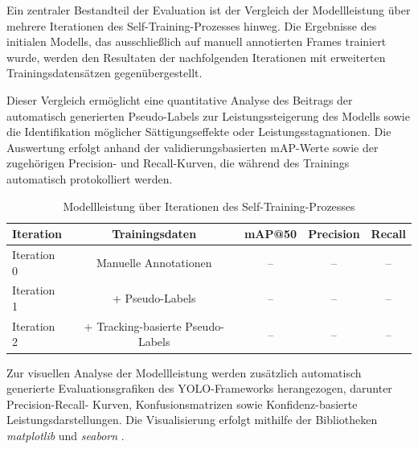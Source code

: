 Ein zentraler Bestandteil der Evaluation ist der Vergleich der Modellleistung über 
mehrere Iterationen des Self-Training-Prozesses hinweg. Die Ergebnisse des initialen 
Modells, das ausschließlich auf manuell annotierten Frames trainiert wurde, werden 
den Resultaten der nachfolgenden Iterationen mit erweiterten Trainingsdatensätzen 
gegenübergestellt.

Dieser Vergleich ermöglicht eine quantitative Analyse des Beitrags der automatisch 
generierten Pseudo-Labels zur Leistungssteigerung des Modells sowie die Identifikation 
möglicher Sättigungseffekte oder Leistungsstagnationen. Die Auswertung erfolgt anhand 
der validierungsbasierten mAP-Werte sowie der zugehörigen Precision- und Recall-Kurven, 
die während des Trainings automatisch protokolliert werden.

\begin{table}[H]
\centering
\caption{Modellleistung über Iterationen des Self-Training-Prozesses}
\label{tab:iteration_comparison}
\begin{tabular}{lcccc}
\hline
\textbf{Iteration} & \textbf{Trainingsdaten} & \textbf{mAP@50} & \textbf{Precision} & \textbf{Recall} \\
\hline
Iteration 0 & Manuelle Annotationen & -- & -- & -- \\
Iteration 1 & + Pseudo-Labels & -- & -- & -- \\
Iteration 2 & + Tracking-basierte Pseudo-Labels & -- & -- & -- \\
\hline
\end{tabular}
\end{table}

Zur visuellen Analyse der Modellleistung werden zusätzlich automatisch generierte 
Evaluationsgrafiken des YOLO-Frameworks herangezogen, darunter Precision-Recall-
Kurven, Konfusionsmatrizen sowie Konfidenz-basierte Leistungsdarstellungen. Die 
Visualisierung erfolgt mithilfe der Bibliotheken \textit{matplotlib} und 
\textit{seaborn} \cite{hunter2007,waskom2021}.
